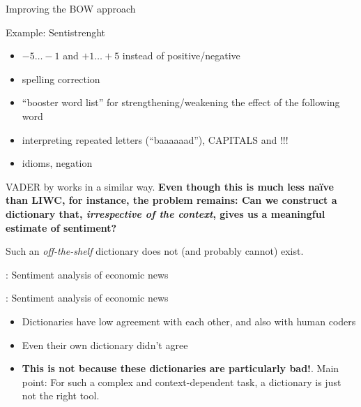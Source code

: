 \documentclass[handout]{beamer}
\begin{document}
\begin{frame}{Improving the BOW approach}
	\begin{block}{Example: Sentistrenght \parencite{Thelwall2012}}
		\begin{itemize}
			\item $-5\ldots-1$ and $+1\ldots+5$ instead of positive/negative
			\item spelling correction
			\item ``booster word list'' for strengthening/weakening the effect of the following word
			\item interpreting repeated letters (``baaaaaad''), CAPITALS and !!!
			\item idioms, negation 
		\end{itemize}
	\end{block}

VADER by \cite{Hutto2014} works in a similar way.
\pause
\textbf{Even though this is much less na\"ive than LIWC, for instance, the problem remains: Can we construct a dictionary that, \emph{irrespective of the context}, gives us a meaningful estimate of sentiment? }
\end{frame}





\begin{frame}[standout]
	Such an \textit{off-the-shelf} dictionary does not (and probably cannot) exist.
\end{frame}





\begin{frame}{\cite{Boukes2020}: Sentiment analysis of economic news}
\end{frame}


\begin{frame}{\cite{Boukes2020}: Sentiment analysis of economic news}
\begin{itemize}
	\item Dictionaries have low agreement with each other, and also with human coders
	\item Even their own dictionary didn't agree
	\item \textbf{This is not because these dictionaries are particularly bad!}. Main point: For such a complex and context-dependent task, a dictionary is just not the right tool.
\end{itemize}
\end{frame}
\end{document}
